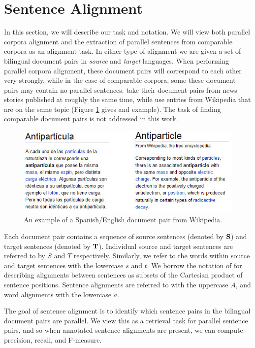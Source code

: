 \section{Sentence Alignment}
In this section, we will describe our task and notation.
We will view both parallel corpora alignment and the extraction of parallel
sentences from comparable corpora as an alignment task. In either type of
alignment we are given a set of bilingual document pairs in {\em source} and {\em
target} languages. When performing parallel corpora alignment, these document
pairs will correspond to each other very strongly, while in the case of
comparable corpora, some these document pairs may contain no parallel sentences.
\citet{Munteanu05} take their document pairs from news stories published at
roughly the same time, while \citet{Adafre06,Smith10} use entries from
Wikipedia that are on the same topic (Figure \ref{fig:wiki} gives and example).
The task of finding comparable document pairs is not addressed in this work.

\begin{figure}[ht]
\includegraphics[width=\textwidth]{images/wiki.jpg}
\caption{An example of a Spanish/English document pair from Wikipedia.}
\label{fig:wiki}
\end{figure}

Each document pair contains a sequence of source sentences (denoted by ${\bf
S}$) and target sentences (denoted by ${\bf T}$). Individual source and target
sentences are referred to by $S$ and $T$ respectively. Similarly, we refer to
the words within source and target sentences with the lowercase $s$ and $t$. We
borrow the notation of \citep{Och03} for describing alignments between sentences
as subsets of the Cartesian product of sentence positions. Sentence alignments
are referred to with the uppercase $A$, and word alignments with the lowercase
$a$.

The goal of sentence alignment is to identify which sentence pairs in the
bilingual document pairs are parallel. We view this as a retrieval task for
parallel sentence pairs, and so when annotated sentence alignments are present,
we can compute precision, recall, and F-measure.
